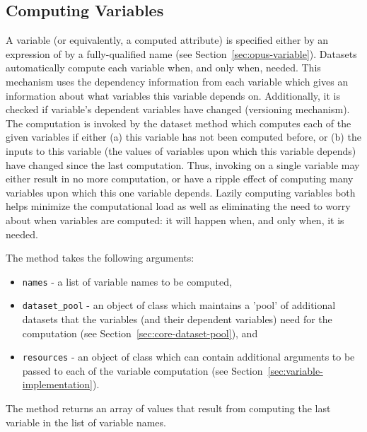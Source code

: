 \subsection{Computing Variables}
%
\label{sec:core-dataset-compute-variables}
%
A variable (or equivalently, a computed attribute) is specified either by an expression of by a 
fully-qualified name (see Section~\ref{sec:opus-variable}).
Datasets \datasetindex automatically compute each variable \variablesindex when, and only when,
needed.   This mechanism uses the dependency information
from each variable \variablesindex which gives an information about what variables \variablesindex this
variable \variablesindex depends on. Additionally, it is checked if variable's \variablesindex dependent
variables \variablesindex have changed (versioning mechanism).  The computation is invoked by
the dataset \datasetindex method  which computes each of the
given variables \variablesindex if either (a) this variable \variablesindex has not been computed before, or
(b) the inputs to this variable \variablesindex (the values of variables \variablesindex upon which this
variable \variablesindex depends) have changed since the last computation.  Thus, invoking
 \variablesindex on a single variable \variablesindex may either result in no more
computation, or have a ripple effect of computing many variables \variablesindex upon which
this one variable \variablesindex depends.  Lazily computing variables \variablesindex both helps minimize the
computational load as well as eliminating the need to worry about when
variables \variablesindex are computed: it will happen when, and only when, it is needed.

The method  \variablesindex takes the following arguments:
\begin{itemize}
\item \verb|names| - a list of
variable \variablesindex names to be computed,
\item \verb|dataset_pool| - an object of class  which
maintains a 'pool' of additional datasets that the variables \variablesindex (and their dependent
variables) \variablesindex need for the computation (see Section~\ref{sec:core-dataset-pool}), and
\item \verb|resources| - an object of class  which can contain additional arguments 
to be passed to each of the variable computation (see Section~\ref{sec:variable-implementation}).
\end{itemize}
The method returns an array of values that result from computing the last variable in the 
list of variable names.

